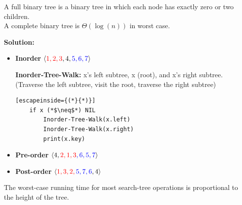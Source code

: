 \documentclass[11pt,fleqn]{book}
\begin{document}
\vspace{1em}
\begin{remark}
A full binary tree is a binary tree in which each node has exactly zero or two children. \\
A complete binary tree is $\Theta(\log(n))$ in worst case.
\end{remark}
\vspace{1em}
\textbf{Solution:}
\begin{itemize}
    \item \textbf{Inorder} $\langle \color{red}1,2,3\color{black},4,\color{blue}5,6,7\color{black} \rangle$
    \begin{definition}
    \textbf{Inorder-Tree-Walk: } x's \color{red}left \color{black} subtree, x (root), and x's \color{blue}right \color{black}  subtree. \\
    (Traverse the left subtree, visit the root, traverse the right subtree)
\begin{lstlisting}[escapeinside={(*}{*)}]
    if x (*$\neq$*) NIL 
        Inorder-Tree-Walk(x.left)
        Inorder-Tree-Walk(x.right)
        print(x.key)
\end{lstlisting}
    \end{definition}
    \item \textbf{Pre-order} $\langle 4,\color{red}2,1,3\color{blue},6,5,7\color{black} \rangle$
    \item \textbf{Post-order} $\langle \color{red}1,3,2,\color{blue}5,7,6\color{black},4 \rangle$
\end{itemize}
\begin{remark}
The worst-case running time for most search-tree operations is proportional to the height of the tree.
\end{remark}
\vspace{1em} 
\end{document}
